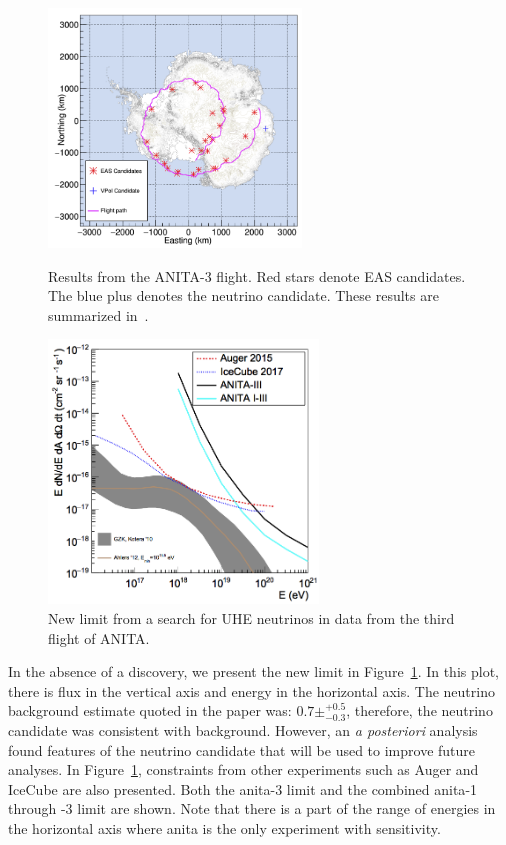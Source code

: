 \begin{figure}
\centering
\includegraphics[width=0.6\textwidth]{figures/candidates.png}
\caption{Results from the ANITA-3 flight. Red stars denote EAS candidates. The blue plus denotes the neutrino candidate. These results are summarized in~\cite{diffuse}.}
\label{candidates} 
\par
\includegraphics[width=0.64\textwidth]{figures/limit_diffuse.png}
\caption{New limit from a search for UHE neutrinos in data from the third flight of ANITA.}
\label{limit_diffuse}
\end{figure}


In the absence of a discovery, we present the new limit in Figure~\ref{limit_diffuse}. In this plot, there is flux in the vertical axis and energy in the horizontal axis. The neutrino background estimate quoted in the paper was: $0.7 ± ^{+0.5}_{-0.3}$, therefore, the neutrino candidate was consistent with background. However, an \textit{a posteriori} analysis found features of the neutrino candidate that will be used to improve future analyses. In Figure~\ref{limit_diffuse}, constraints from other experiments such as Auger and IceCube are also presented. Both the \gls{anita}-3 limit and the combined \gls{anita}-1 through -3 limit are shown. Note that there is a part of the range of energies in the horizontal axis where \gls{anita} is the only experiment with sensitivity. 

